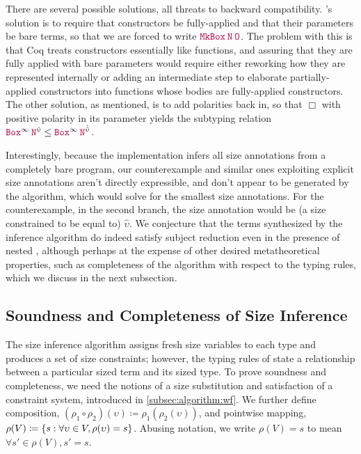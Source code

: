 There are several possible solutions, all threats to backward compatibility.
\CIChat's solution is to require that constructors be fully-applied and that their parameters be bare terms,
so that we are forced to write $\app{\MkBox}{\nat}{\Zero}$.
The problem with this is that Coq treats constructors essentially like functions,
and assuring that they are fully applied with bare parameters would require either reworking how they are represented internally
or adding an intermediate step to elaborate partially-applied constructors into functions whose bodies are fully-applied constructors.
The other solution, as mentioned, is to add polarities back in, so that $\Box$ with positive polarity in its parameter yields the subtyping relation $\app{\Box^\infty}{\nat^{\hat{\upsilon}}} \leq \app{\Box^\infty}{\nat^{\hat{\hat{\upsilon}}}}$.

Interestingly, because the implementation infers all size annotations from a completely bare program,
our counterexample and similar ones exploiting explicit size annotations aren't directly expressible,
and don't appear to be generated by the algorithm, which would solve for the smallest size annotations.
For the counterexample, in the second branch, the size annotation would be (a size constrained to be equal to) $\hat{\upsilon}$.
We conjecture that the terms synthesized by the inference algorithm do indeed satisfy subject reduction even in the presence of nested \coinductives,
although perhaps at the expense of other desired metatheoretical properties,
such as completeness of the algorithm with respect to the typing rules,
which we discuss in the next subsection.

\subsection{Soundness and Completeness of Size Inference}\label{sec:meta:sound-complete}
The size inference algorithm assigns fresh size variables to each \coinductive type and produces a set of size constraints; however, the typing rules of \lang state a relationship between a particular sized term and its sized type.
To prove soundness and completeness, we need the notions of a size substitution and satisfaction of a constraint system, introduced in \autoref{subsec:algorithm:wf}.
We further define composition, $(\rho_1 \circ \rho_2)(\upsilon) \coloneqq \rho_1(\rho_2(\upsilon))$, and pointwise mapping, $\rho(V) \coloneqq \{s : \forall \upsilon \in V, \rho(\upsilon) = s\}$.
Abusing notation, we write $\rho(V) = s$ to mean $\forall s' \in \rho(V), s' = s$.

